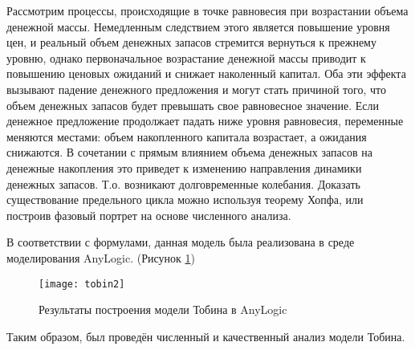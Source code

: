 Рассмотрим процессы, происходящие в точке равновесия при возрастании объема денежной массы. Немедленным следствием этого является повышение уровня цен, и реальный объем денежных запасов стремится вернуться к прежнему уровню, однако первоначальное возрастание денежной массы приводит к повышению ценовых ожиданий и снижает наколенный капитал. Оба эти эффекта вызывают падение денежного предложения и могут стать причиной того, что объем денежных запасов будет превышать свое равновесное значение. Если денежное предложение продолжает падать ниже уровня равновесия, переменные меняются местами: объем накопленного капитала возрастает, а ожидания снижаются. В сочетании с прямым влиянием объема денежных запасов на денежные накопления это приведет к изменению направления динамики денежных запасов. Т.о. возникают долговременные колебания. Доказать существование предельного цикла можно используя теорему Хопфа, или построив фазовый портрет на основе численного анализа.

\newpage

В соответствии с формулами, данная модель была реализована в среде моделирования AnyLogic. (Рисунок \ref{fig:tobin2})
\begin{figure}[h]
	\centering \texttt{[image: tobin2]}
	\caption{Результаты построения модели Тобина в AnyLogic}
	\label{fig:tobin2}
\end{figure}

Таким образом, был проведён численный и качественный анализ модели Тобина.\\